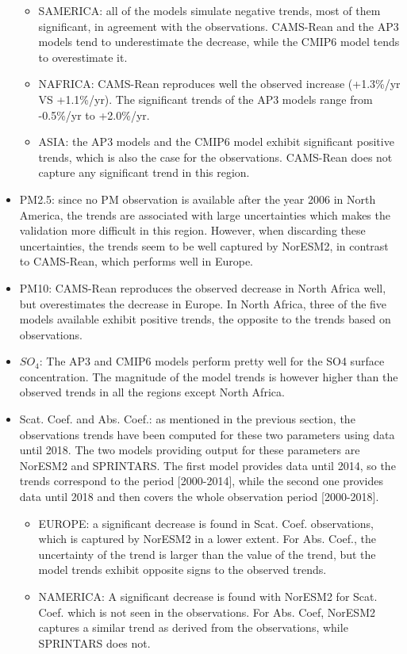 \documentclass[journal abbreviation, manuscript]{copernicus}
\begin{document}
\begin{itemize}
\begin{itemize}
        \item SAMERICA: all of the models simulate negative trends, most of them significant, in agreement with the observations. CAMS-Rean and the AP3 models tend to underestimate the decrease, while the CMIP6 model tends to overestimate it.
        \item NAFRICA: CAMS-Rean reproduces well the observed increase (+1.3\%/yr VS +1.1\%/yr). The significant trends of the AP3 models range from -0.5\%/yr to +2.0\%/yr.
        \item ASIA: the AP3 models and the CMIP6 model exhibit significant positive trends, which is also the case for the observations. CAMS-Rean does not capture any significant trend in this region.
       \end{itemize}
 \item PM2.5: since no PM observation is available after the year 2006 in North America, the trends are associated with large uncertainties which makes the validation more difficult in this region. However, when discarding these uncertainties, the trends seem to be well captured by NorESM2, in contrast to CAMS-Rean, which performs well in Europe.
 \item PM10: CAMS-Rean reproduces the observed decrease in North Africa well, but overestimates the decrease in Europe. In North Africa, three of the five models available exhibit positive trends, the opposite to the trends based on observations.
 \item $SO_{4}$: The AP3 and CMIP6 models perform pretty well for the SO4 surface concentration. The magnitude of the model trends is however higher than the observed trends in all the regions except North Africa.
 \item Scat. Coef. and Abs. Coef.:  as mentioned in the previous section, the observations trends have been computed for these two parameters using data until 2018. The two models providing output for these parameters are NorESM2 and SPRINTARS. The first model provides data until 2014, so the trends correspond to the period [2000-2014], while the second one provides data until 2018 and then covers the whole observation period [2000-2018].
       \begin{itemize}
        \item EUROPE: a significant decrease is found in Scat. Coef. observations, which is captured by NorESM2 in a lower extent. For Abs. Coef., the uncertainty of the trend is larger than the value of the trend, but the model trends exhibit opposite signs to the observed trends.
        \item NAMERICA: A significant decrease is found with NorESM2 for Scat. Coef. which is not seen in the observations. For Abs. Coef, NorESM2 captures a similar trend as derived from the observations, while SPRINTARS does not.
       \end{itemize}
\end{itemize}
\end{document}
